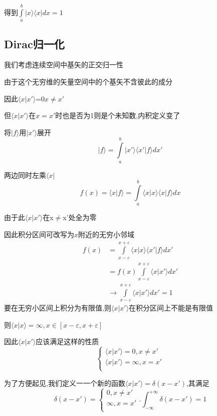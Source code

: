 \documentclass[lang=cn,15pt]{elegantbook}
\begin{document}
得到$\int\limits_a^b{| x\rangle \langle x| dx}=1	$
\subsection{Dirac归一化}

我们考虑连续空间中基矢的正交归一性

由于这个无穷维的矢量空间中的个基矢不含彼此的成分

因此$\langle x|x'\rangle$=0$x\ne x'$

但$\langle x|x'\rangle$在$x=x'$时也是否为1则是个未知数,内积定义变了

将$|f\rangle$用$|x'\rangle$展开
\begin{equation*}
	|f\rangle =\int\limits_a^b{|x'\rangle \langle x'|f\rangle dx'}
\end{equation*}

两边同时左乘$\langle x|$
\begin{equation*}
	f(x)=\langle x|f\rangle =\int\limits_a^b{\langle x|x\rangle \langle x|f\rangle dx}
\end{equation*}

由于此$\langle x|x'\rangle$在x$\ne$x'处全为零

因此积分区间可改写为$ x$附近的无穷小邻域
\begin{equation*}
	\begin{split}
		f\left( x \right) &=\int\limits_{x-\varepsilon}^{x+\varepsilon}{\langle x|x\rangle \langle x'|f\rangle dx'}
		\\
		&=f\left( x \right) \int\limits_{x-\varepsilon}^{x+\varepsilon}{\langle x|x'\rangle dx'}
		\\
		&\rightarrow \int\limits_{x-\varepsilon}^{x+\varepsilon}{\langle x|x'\rangle dx'}=1
	\end{split}
\end{equation*}
要在无穷小区间上积分为有限值,则$\langle x|x'\rangle$在积分区间上不能是有限值

则$\langle x|x\rangle=\infty,x\in[x-\varepsilon,x+\varepsilon]$

因此$\langle x|x'\rangle$应该满足这样的性质
\begin{equation*}
	\begin{cases}
		\langle x|x'\rangle =0,x\ne x'\\
		\langle x|x'\rangle =\infty ,x=x'\\
	\end{cases}
\end{equation*}

为了方便起见,我们定义一一个新的函数$\langle x|x'\rangle=\delta(x-x') $,其满足
\begin{equation*}
	\delta \left( x-x' \right) =\begin{cases}
		0,x\ne x'\\
		\infty ,x=x'\\
	\end{cases}.\int_{-\infty}^{+\infty}{\delta \left( x-x' \right)}=1
\end{equation*}
 
\end{document}
